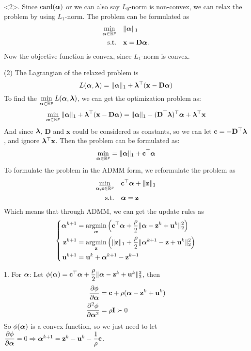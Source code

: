 <2>. Since $\text{card}(\boldsymbol{\alpha})$ or we can also say $L_0$-norm is non-convex, we can relax the problem by using $L_1$-norm. The problem can be formulated as
\begin{align*}
\min_{\boldsymbol{\alpha}\in\mathbb{R}^p} & \quad \|\boldsymbol{\alpha}\|_1 \\
\text{s.t.} & \quad \mathbf{x} = \mathbf{D}\boldsymbol{\alpha}.
\end{align*}
Now the objective function is convex, since $L_1$-norm is convex.

(2) The Lagrangian of the relaxed problem is
$$L(\boldsymbol{\alpha}, \boldsymbol{\lambda}) = \|\boldsymbol{\alpha}\|_1 + \boldsymbol{\lambda}^{\top}(\mathbf{x} - \mathbf{D}\boldsymbol{\alpha})$$
To find the $\min\limits_{\boldsymbol{\alpha}\in\mathbb{R}^p}L(\boldsymbol{\alpha}, \boldsymbol{\lambda})$, we can get the optimization problem as:
$$\min_{\boldsymbol{\alpha}\in\mathbb{R}^p} \|\boldsymbol{\alpha}\|_1 + \boldsymbol{\lambda}^{\top}(\mathbf{x} - \mathbf{D}\boldsymbol{\alpha}) = \|\boldsymbol{\alpha}\|_1 - (\mathbf{D}^{\top}\boldsymbol{\lambda})^{\top}\boldsymbol{\alpha} + \boldsymbol{\lambda}^{\top}\mathbf{x}$$
And since $\boldsymbol{\lambda}$, $\mathbf{D}$ and $\mathbf{x}$ could be considered as constants, so we can let $\mathbf{c} = -\mathbf{D}^{\top}\boldsymbol{\lambda}$, and ignore $\boldsymbol{\lambda}^{\top}\mathbf{x}$. Then the problem can be formulated as:
$$\min_{\boldsymbol{\alpha}\in\mathbb{R}^p} = \|\boldsymbol{\alpha}\|_1 + \mathbf{c}^{\top}\boldsymbol{\alpha}$$
To formulate the problem in the ADMM form, we reformulate the problem as
\begin{align*}
\min_{\boldsymbol{\alpha},\mathbf{z}\in\mathbb{R}^p} & \quad \mathbf{c}^{\top}\boldsymbol{\alpha} + \|\mathbf{z}\|_1 \\
\text{s.t.} & \quad \boldsymbol{\alpha} = \mathbf{z}
\end{align*}
Which means that through ADMM, we can get the update rules as
$$\left\{
\begin{aligned}
\boldsymbol{\alpha}^{k+1} & = \mathop{\rm argmin}_{\boldsymbol{\alpha}} \left(\mathbf{c}^{\top}\boldsymbol{\alpha} + \dfrac{\rho}{2}\|\boldsymbol{\alpha} - \mathbf{z}^k + \mathbf{u}^k\|_2^2\right) \\
\mathbf{z}^{k+1} & = \mathop{\rm argmin}_{\mathbf{z}} \left(\|\mathbf{z}\|_1 + \dfrac{\rho}{2}\|\boldsymbol{\alpha}^{k+1} - \mathbf{z} + \mathbf{u}^k\|_2^2\right) \\
\mathbf{u}^{k+1} & = \mathbf{u}^k + \boldsymbol{\alpha}^{k+1} - \mathbf{z}^{k+1}
\end{aligned}
\right.$$

1. For $\boldsymbol{\alpha}$: Let $\phi(\boldsymbol{\alpha}) = \mathbf{c}^{\top}\boldsymbol{\alpha} + \dfrac{\rho}{2}\|\boldsymbol{\alpha} - \mathbf{z}^k + \mathbf{u}^k\|_2^2$, then
\begin{align*}
\dfrac{\partial \phi}{\partial \boldsymbol{\alpha}} & = \mathbf{c} + \rho(\boldsymbol{\alpha} - \mathbf{z}^k + \mathbf{u}^k)\\
\dfrac{\partial^2 \phi}{\partial \boldsymbol{\alpha}^2} & = \rho \mathbf{I} \succ 0
\end{align*}
So $\phi(\boldsymbol{\alpha})$ is a convex function, so we just need to let $\dfrac{\partial \phi}{\partial \boldsymbol{\alpha}} = 0\Rightarrow \boldsymbol{\alpha}^{k+1} = \mathbf{z}^k - \mathbf{u}^k - \dfrac{1}{\rho}\mathbf{c}$.


